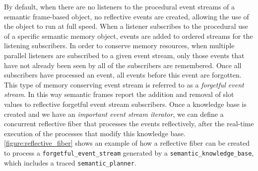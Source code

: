 By default, when there are no listeners to the procedural event
streams of a semantic frame-based object, no reflective events are
created, allowing the use of the object to run at full speed.  When a
listener subscribes to the procedural use of a specific semantic
memory object, events are added to ordered streams for the listening
subscribers.  In order to conserve memory resources, when multiple
parallel listeners are subscribed to a given event stream, only those
events that have not already been seen by all of the subscribers are
remembered.  Once all subscribers have processed an event, all events
before this event are forgotten.  This type of memory conserving event
stream is referred to as a {\emph{forgetful event stream}}.  In this
way semantic frames report the addition and removal of slot values to
reflective forgetful event stream subscribers.  Once a knowledge base
is created and we have an {\emph{important event stream iterator}}, we
can define a concurrent reflective fiber that processes the events
reflectively, after the real-time execution of the processes that
modify this knowledge base.
{\mbox{\autoref{figure:reflective_fiber}}} shows an example of how a
reflective fiber can be created to process a
{\tt{forgetful\_event\_stream}} generated by a
{\tt{semantic\_knowledge\_base}}, which includes a traced
{\tt{semantic\_planner}}.
